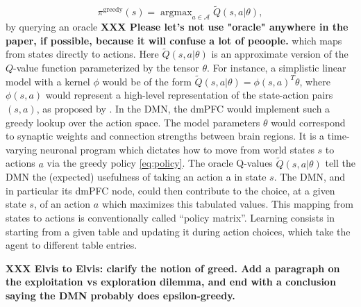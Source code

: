 \documentclass[10pt,letterpaper]{article}
\DeclareMathOperator{\argmax}{argmax}
\begin{document}
\begin{equation}
  \pi^{\text{greedy}}(s) = \argmax_{a \in \mathcal A}\tilde{Q}(s, a|\theta),
  \label{eq:policy}
\end{equation}
by querying an oracle \textbf{XXX Please let's not use "oracle" anywhere in
the paper, if possible, because it will confuse a lot of peoople.}
which maps from states directly to actions. Here $\tilde{Q}(s,a|\theta)$ is an
approximate version of the $Q$-value function parameterized by the tensor $\theta$.
For instance, a simplistic linear model with a kernel $\phi$ would be of the
form $\tilde{Q}(s, a|\theta) = \phi(s,a)^T\theta$, where
$\phi(s,a)$ would represent a high-level representation of the state-action pairs
$(s,a)$, as proposed by \citep{songNIPS2016}.
In the DMN, the dmPFC would implement such a greedy lookup
over the action space.
The model
  parameters $\theta$ would correspond to synaptic weights and connection strengths between
  brain regions. It is a time-varying neuronal program which dictates how to move from world states $s$ to actions $a$ via the greedy policy \eqref{eq:policy}.
  The oracle Q-values $\tilde{Q}(s, a|\theta)$ tell the DMN the (expected) usefulness of taking an action a in state $s$.
  The DMN, and in particular its dmPFC node, could then contribute to the choice, at a given state $s$, of an action $a$ which maximizes this tabulated values. This mapping from states to actions is conventionally called ``policy matrix''.
  Learning consists in starting from a given table and
  updating it during action choices,
  which take the agent to different table entries.

\textbf{XXX Elvis to Elvis: clarify the notion of greed. Add a paragraph on the exploitation vs exploration dilemma, and end with a conclusion saying the DMN probably does epsilon-greedy.}

\end{document}
